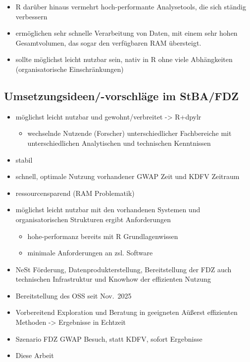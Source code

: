 \documentclass[
  german,
  10pt,
  twoside]{article}
\providecommand{\tightlist}{%
  \setlength{\itemsep}{0pt}\setlength{\parskip}{0pt}}
\begin{document}
\begin{itemize}
\tightlist
\item
  R darüber hinaus vermehrt hoch-performante Analysetools, die sich
  ständig verbessern
\item
  ermöglichen sehr schnelle Verarbeitung von Daten, mit einem sehr hohen
  Gesamtvolumen, das sogar den verfügbaren RAM übersteigt.
\item
  sollte möglichst leicht nutzbar sein, nativ in R ohne viele
  Abhängkeiten (organisatorische Einschränkungen)
\end{itemize}

\subsection{Umsetzungsideen/-vorschläge im
StBA/FDZ}\label{umsetzungsideen-vorschluxe4ge-im-stbafdz}

\begin{itemize}
\item
  möglichst leicht nutzbar und gewohnt/verbreitet -\textgreater{}
  R+dpylr

  \begin{itemize}
  \tightlist
  \item
    wechselnde Nutzende (Forscher) unterschiedlicher Fachbereiche mit
    unterschiedlichen Analytischen und technischen Kenntnissen
  \end{itemize}
\item
  stabil
\item
  schnell, optimale Nutzung vorhandener GWAP Zeit und KDFV Zeitraum
\item
  ressourcensparend (RAM Problematik)
\item
  möglichst leicht nutzbar mit den vorhandenen Systemen und
  organisatorischen Strukturen ergibt Anforderungen

  \begin{itemize}
  \tightlist
  \item
    hohe-performanz bereits mit R Grundlagenwissen
  \item
    minimale Anforderungen an zsl. Software
  \end{itemize}
\item
  NeSt Förderung, Datenprodukterstellung, Bereitstellung der FDZ auch
  technischen Infrastruktur und Knowhow der effizienten Nutzung
\item
  Bereitstellung des OSS seit Nov.~2025
\item
  Vorbereitend Exploration und Beratung in geeigneten Aüßerst
  effizienten Methoden -\textgreater{} Ergebnisse in Echtzeit
\item
  Szenario FDZ GWAP Besuch, statt KDFV, sofort Ergebnisse
\item
  Diese Arbeit
\end{itemize}
\end{document}
